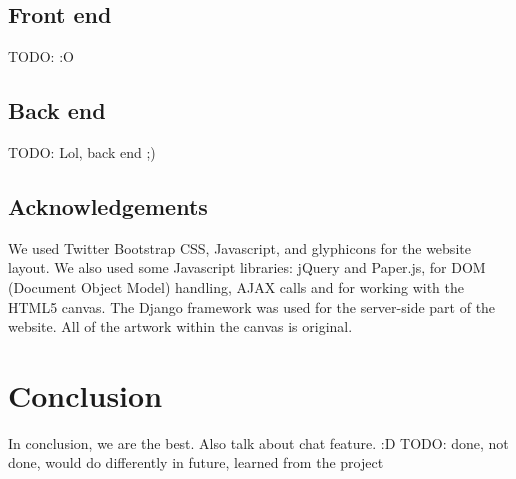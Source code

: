 \documentclass{article}
\begin{document}
\subsection{Front end}
TODO: :O

\subsection{Back end}
TODO: Lol, back end ;)

\subsection{Acknowledgements}
We used Twitter Bootstrap CSS, Javascript, and glyphicons for the website layout. We also used some Javascript libraries: jQuery and Paper.js, for DOM (Document Object Model) handling, AJAX calls and for working with the HTML5 canvas. The Django framework was used for the server-side part of the website. All of the artwork within the canvas is original.

\section{Conclusion}
In conclusion, we are the best. Also talk about chat feature. :D
TODO: done, not done, would do differently in future, learned from the project
\end{document}
